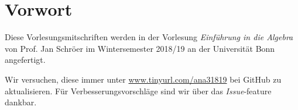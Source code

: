\chapter*{Vorwort}
Diese Vorlesungsmitschriften werden in der Vorlesung \textit{Einführung in die Algebra} von Prof. Jan Schröer im Wintersemester 2018/19 an der Universität Bonn angefertigt.\par
Wir versuchen, diese immer unter \url{www.tinyurl.com/ana31819} bei GitHub zu aktualisieren. Für Verbesserungsvorschläge sind wir über das \textit{Issue}-feature dankbar.